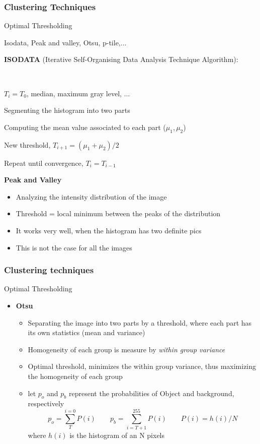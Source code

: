 \documentclass{beamer}
\begin{document}
\begin{frame}
\frametitle{Clustering Techniques}
\begin{block}{Optimal Thresholding}
\begin{itemize}
\footnotesize{
\item Isodata, Peak and valley, Otsu, p-tile,...
\item \textbf{ISODATA} (Iterative Self-Organising Data Analysis Technique Algorithm):} \\
\begin{itemize}
\scriptsize{
\item $T_{i} = T_{0}$, median, maximum gray level, ...
\item Segmenting the histogram into two parts
\item Computing the mean value associated to each part ($\mu_{1}, \mu_{2}$)
\item New threshold, $T_{i+1} = (\mu_{1}+ \mu_{2})/2$
\item Repeat until convergence, $T_{i} = T_{i-1}$

}
\end{itemize}
\item\textbf{Peak and Valley}
\begin{itemize}
\item Analyzing the intensity distribution of the image
\item Threshold = local minimum between the peaks of the distribution
\item It works very well, when the histogram has two definite pics
\item This is not the case for all the images
\end{itemize}
\end{itemize}
\end{block}
\end{frame}
\begin{frame}
\frametitle{Clustering techniques}
\begin{block}{Optimal Thresholding}
\begin{itemize}
\item \textbf{Otsu}
\begin{itemize}
\item Separating the image into two parts by a threshold, where each part has its own statistics (mean and variance)
\item Homogeneity of each group is measure by \textit{within group variance}
\item Optimal threshold, minimizes the within group variance, thus maximizing the homogeneity of each group
\item let $p_{o}$ and $p_{b}$ represent the probabilities of Object and background, respectively
$$ p_{o} = \sum\limits_{T}^{i=0}P(i) \qquad p_{b}= \sum\limits_{i=T+1}^{255}P(i) \qquad P(i) = h(i)/N $$ 
\noindent where $h(i)$ is the histogram of an N pixels 
\end{itemize}
\end{itemize}

\end{block}
\end{frame}
\end{document}
